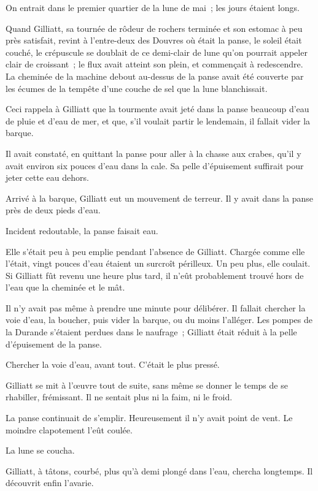 \documentclass[french,twoside]{book} %
\begin{document}
 On entrait dans le premier quartier de la lune de mai ; les jours étaient longs.\par
Quand Gilliatt, sa tournée de rôdeur de rochers terminée et son estomac à peu près satisfait, revint à l’entre-deux des Douvres où était la panse, le soleil était couché, le crépuscule se doublait de ce demi-clair de lune qu’on pourrait appeler clair de croissant ; le flux avait atteint son plein, et commençait à redescendre. La cheminée de la machine debout au-dessus de la panse avait été couverte par les écumes de la tempête d’une couche de sel que la lune blanchissait.\par
Ceci rappela à Gilliatt que la tourmente avait jeté dans la panse beaucoup d’eau de pluie et d’eau de mer, et que, s’il voulait partir le lendemain, il fallait vider la barque.\par
Il avait constaté, en quittant la panse pour aller à la chasse aux crabes, qu’il y avait environ six pouces d’eau dans la cale. Sa pelle d’épuisement suffirait pour jeter cette eau dehors.\par
Arrivé à la barque, Gilliatt eut un mouvement de terreur. Il y avait dans la panse près de deux pieds d’eau.\par
Incident redoutable, la panse faisait eau.\par
Elle s’était peu à peu emplie pendant l’absence de Gilliatt. Chargée comme elle l’était, vingt pouces d’eau étaient un surcroît périlleux. Un peu plus, elle coulait. Si Gilliatt fût revenu une heure plus tard, il n’eût probablement trouvé hors de l’eau que la cheminée et le mât.\par
 Il n’y avait pas même à prendre une minute pour délibérer. Il fallait chercher la voie d’eau, la boucher, puis vider la barque, ou du moins l’alléger. Les pompes de la Durande s’étaient perdues dans le naufrage ; Gilliatt était réduit à la pelle d’épuisement de la panse.\par
Chercher la voie d’eau, avant tout. C’était le plus pressé.\par
Gilliatt se mit à l’œuvre tout de suite, sans même se donner le temps de se rhabiller, frémissant. Il ne sentait plus ni la faim, ni le froid.\par
La panse continuait de s’emplir. Heureusement il n’y avait point de vent. Le moindre clapotement l’eût coulée.\par
La lune se coucha.\par
Gilliatt, à tâtons, courbé, plus qu’à demi plongé dans l’eau, chercha longtemps. Il découvrit enfin l’avarie.\par
\end{document}
